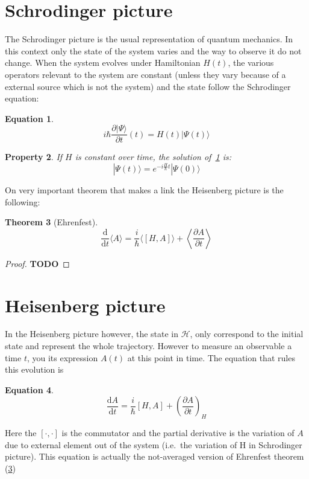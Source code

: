 \documentclass[10pt]{report}
\theoremstyle{plain}
\newtheorem{thm}{Theorem}[chapter]
\newtheorem{prop}[thm]{Property}
\theoremstyle{definition}
\newtheorem{eqn}[thm]{Equation}
\theoremstyle{remark}
\newcommand{\TODO}{\textbf{TODO}}
\newcommand{\ket}[1]{|#1\rangle}
\newcommand{\dd}{\mathrm{d}}
\newcommand{\der}[2]{\frac{\dd{#1}}{\dd{#2}}}
\newcommand{\dpar}[2]{\frac{\partial{#1}}{\partial{#2}}}
\begin{document}
\section{Schrodinger picture}

The Schrodinger picture is the usual representation of quantum mechanics. In
this context only the state of the system varies and the way to observe it do
not change. When the system evolves under Hamiltonian $H(t)$,
the various operators relevant to the system are constant (unless they vary
because of a external source which is not the system) and the
state follow the Schrodinger equation:
\begin{eqn}\label{eqn:schro}
\[i\hbar \frac{\partial \ket \Psi}{\partial t} (t) = H(t) \ket {\Psi(t)} \]
\end{eqn}

\begin{prop}
  If $H$ is constant over time, the solution of~\cref{eqn:schro} is:
  \[ \ket {\Psi(t)} = e^{-i\frac H\hbar t}\ket{\Psi(0)}\]
\end{prop}

On very important theorem that makes a link the Heisenberg picture is the
following:

\begin{thm}[Ehrenfest]\label{thm:ehren}
  \[\der{}t\langle A\rangle = \frac i\hbar\langle[H,A]\rangle + \left\langle\dpar
      A t \right\rangle\]
\end{thm}

\begin{proof}
  \TODO
\end{proof}


\section{Heisenberg picture}

In the Heisenberg picture however, the state in $\mathcal{H}$, only correspond
to the initial state and represent the whole trajectory. However to measure an
observable a time $t$, you its expression $A(t)$ at this point in time. The
equation that rules this evolution is



\begin{eqn}
  \[\der At   = \frac i {\hbar}[H,A] + {\left(\dpar At \right)}_{\!\!H}\]
\end{eqn}

Here the $[\cdot,\cdot]$ is the commutator and the partial derivative is the
variation of $A$ due to external element out of the system (i.e.~the variation
of H in Schrodinger picture). This equation is actually the not-averaged version
of Ehrenfest theorem (\ref{thm:ehren})
\end{document}
